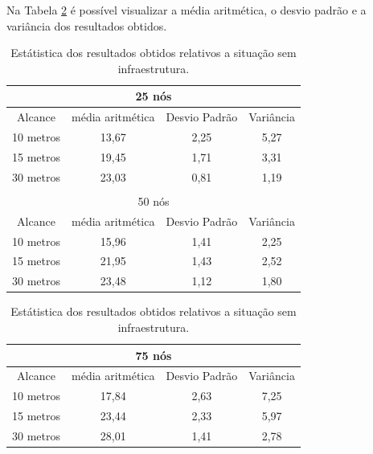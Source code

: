 	Na Tabela \ref{tab:estatiscaResultadosObtidosSemInfraestrutura} é possível visualizar a média aritmética, o desvio padrão e a variância dos resultados obtidos. 

	\begin{table}[!htb]
	    \caption{Estátistica dos resultados obtidos relativos a situação sem infraestrutura.}
	    \label{tab:estatiscaResultadosObtidosSemInfraestrutura}
	    \centering
	    \tiny
	    \begin{minipage}{.5\linewidth}
	      
	      \centering
	        \begin{tabular}{|c|c|c|c|}

			\hline
			\multicolumn{4}{|c|}{25 nós} \\ \hline
			Alcance   & média aritmética &	Desvio Padrão &	Variância  \\ \hline
			10 metros &	13,67 & 2,25 &	5,27  \\ \hline
			15 metros &	19,45 & 1,71 &	3,31  \\ \hline
			30 metros &	23,03 & 0,81 &	1,19 \\ \hline

			\multicolumn{4}{|c|}{} \\ \hline

			\multicolumn{4}{|c|}{50 nós} \\ \hline
			Alcance   & média aritmética &	Desvio Padrão &	Variância  \\ \hline
			10 metros &	15,96	& 1,41 & 2,25  \\ \hline
			15 metros &	21,95	& 1,43 & 2,52  \\ \hline
			30 metros &	23,48	& 1,12 & 1,80 \\ \hline

		\end{tabular}
	    \end{minipage}%
	    \begin{minipage}{.5\linewidth}
	      \centering
	        \begin{tabular}{|c|c|c|c|}
	        \hline
			\multicolumn{4}{|c|}{75 nós} \\ \hline
			Alcance   & média aritmética &	Desvio Padrão &	Variância  \\ \hline
			10 metros &	17,84 & 2,63 & 7,25  \\ \hline
			15 metros &	23,44 & 2,33 & 5,97  \\ \hline
			30 metros &	28,01 & 1,41 & 2,78 \\ \hline


\end{tabular}
\end{minipage}
\end{table}
